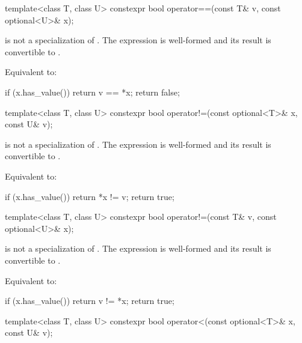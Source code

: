 %
\begin{itemdecl}
template<class T, class U>
  constexpr bool operator==(const T& v, const optional<U>& x);
\end{itemdecl}

\begin{itemdescr}
\pnum
\constraints
{} is not a specialization of . The expression  is well-formed and its result is convertible to .

\pnum
\effects
Equivalent to:
\begin{codeblock}
if (x.has_value())
  return v == *x;
return false;
\end{codeblock}
\end{itemdescr}

%
\begin{itemdecl}
template<class T, class U>
  constexpr bool operator!=(const optional<T>& x, const U& v);
\end{itemdecl}

\begin{itemdescr}
\pnum
\constraints
{} is not a specialization of . The expression  is well-formed and its result is convertible to .

\pnum
\effects
Equivalent to:
\begin{codeblock}
if (x.has_value())
  return *x != v;
return true;
\end{codeblock}
\end{itemdescr}

%
\begin{itemdecl}
template<class T, class U>
  constexpr bool operator!=(const T& v, const optional<U>& x);
\end{itemdecl}

\begin{itemdescr}
\pnum
\constraints
{} is not a specialization of . The expression  is well-formed and its result is convertible to .

\pnum
\effects
Equivalent to:
\begin{codeblock}
if (x.has_value())
  return v != *x;
return true;
\end{codeblock}
\end{itemdescr}

%
\begin{itemdecl}
template<class T, class U>
  constexpr bool operator<(const optional<T>& x, const U& v);
\end{itemdecl}


